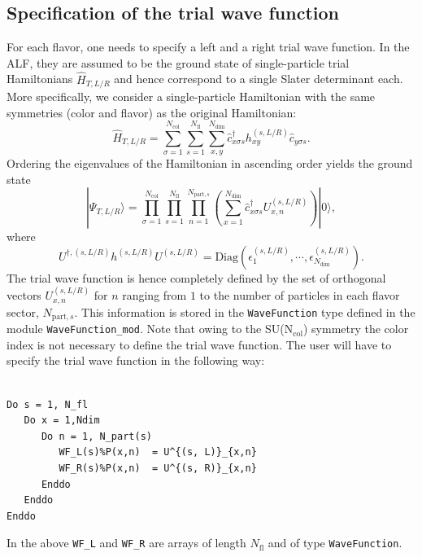 \subsection{ Specification of the trial wave function }

For each flavor, one needs to specify a left and a right trial wave function. In the ALF, they are assumed to be the ground state of single-particle trial Hamiltonians $\hat{H}_{T, L/R}$ and hence correspond to a single Slater determinant each. More specifically, we consider a single-particle Hamiltonian with the same symmetries (color and flavor) as the original Hamiltonian: 
\begin{equation}
\hat{H}_{T,L/R} = 
\sum\limits_{\sigma=1}^{N_{\mathrm{col}}}
\sum\limits_{s=1}^{N_{\mathrm{fl}}}
\sum\limits_{x,y}^{N_{\mathrm{dim}}}
\hat{c}^{\dagger}_{x \sigma   s} h_{xy}^{(s, L/R)} \hat{c}^{\phantom\dagger}_{y \sigma s}.
\end{equation}
Ordering the eigenvalues  of the Hamiltonian in ascending order yields the ground state
\begin{equation}
	 | \Psi_{T,L/R} \rangle    =     \prod_{\sigma=1}^{N_{\mathrm{col}}}  \prod_{s=1}^{N_{\mathrm{fl}}}      \prod_{n=1}^{N_{\mathrm{part},s}} 
	 \left( \sum_{x=1}^{N_{\mathrm{dim}}}    \hat{c}^{\dagger}_{x \sigma   s} U^{(s, L/R)}_{x,n} \right) 
	  | 0 \rangle ,
\end{equation} 
where 
\begin{equation}
	U^{\dagger,(s, L/R)}h^{(s, L/R)}  U^{(s, L/R)}   = \mathrm{Diag} \left(   \epsilon_1^{(s, L/R)}, \cdots, \epsilon_{N_{\mathrm{dim}}}^{(s, L/R)} \right).
\end{equation}
The trial wave function is hence  completely defined by the set of orthogonal vectors  $ U^{(s, L/R)}_{x,n}  $    for  $ n $ ranging from  $ 1 $ to  the number of particles   in each flavor sector,  $N_{\mathrm{part},s}$.    This information  is stored in the \texttt{WaveFunction}   type defined in the module \texttt{WaveFunction\_mod}.    Note  that  owing to the SU(N$_{\mathrm{col}}$) symmetry the color index is not necessary to define  the trial wave function.  The user will have to specify the trial wave function in the following way:
\begin{lstlisting}[style=fortran]

Do s = 1, N_fl
   Do x = 1,Ndim
      Do n = 1, N_part(s)
         WF_L(s)%P(x,n)  = U^{(s, L)}_{x,n}
         WF_R(s)%P(x,n)  = U^{(s, R)}_{x,n}
      Enddo
   Enddo
Enddo
\end{lstlisting}
In the above    \texttt{WF\_L}  and \texttt{WF\_R}  are arrays  of length $N_{\mathrm{fl}}$ and of type \texttt{WaveFunction}.

